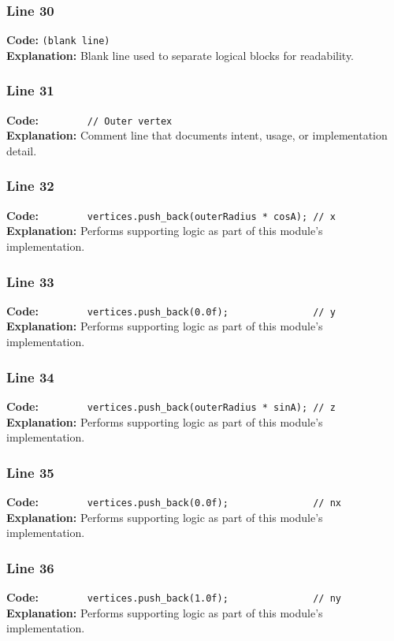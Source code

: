 \documentclass[11pt,a4paper]{article}
\begin{document}
\subsubsection*{Line 30}
\textbf{Code:} \texttt{(blank line)}\\
\textbf{Explanation:} Blank line used to separate logical blocks for readability.

\subsubsection*{Line 31}
\textbf{Code:} \verb|        // Outer vertex|\\
\textbf{Explanation:} Comment line that documents intent, usage, or implementation detail.

\subsubsection*{Line 32}
\textbf{Code:} \verb|        vertices.push_back(outerRadius * cosA); // x|\\
\textbf{Explanation:} Performs supporting logic as part of this module's implementation.

\subsubsection*{Line 33}
\textbf{Code:} \verb|        vertices.push_back(0.0f);               // y|\\
\textbf{Explanation:} Performs supporting logic as part of this module's implementation.

\subsubsection*{Line 34}
\textbf{Code:} \verb|        vertices.push_back(outerRadius * sinA); // z|\\
\textbf{Explanation:} Performs supporting logic as part of this module's implementation.

\subsubsection*{Line 35}
\textbf{Code:} \verb|        vertices.push_back(0.0f);               // nx|\\
\textbf{Explanation:} Performs supporting logic as part of this module's implementation.

\subsubsection*{Line 36}
\textbf{Code:} \verb|        vertices.push_back(1.0f);               // ny|\\
\textbf{Explanation:} Performs supporting logic as part of this module's implementation.
\end{document}
